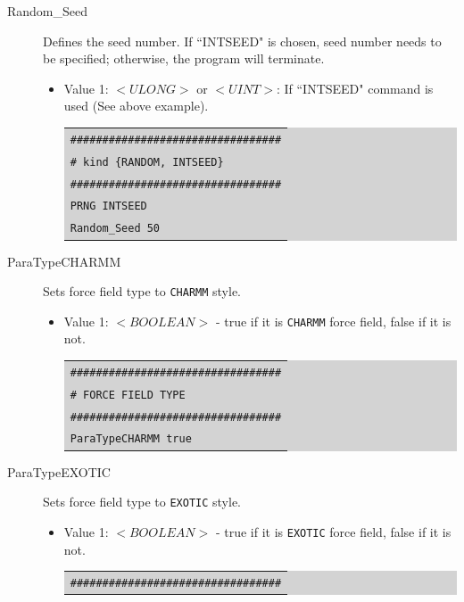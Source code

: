 \begin{description}
\begin{itemize}
\begin{itemize}
{\begin{tabular}{l}
		\end{tabular}}
		\end{itemize}
	\end{itemize}
\item [Random\_Seed] Defines the seed number. If ``INTSEED" is chosen, seed number needs to be specified; otherwise, the program will terminate.
	\begin{itemize}
	\item Value 1: $<ULONG>$ or $<UINT>$: If ``INTSEED" command is used (See above example).\\
	\colorbox{lightgray}{
	\begin{tabular}{l}
	\texttt{\#\#\#\#\#\#\#\#\#\#\#\#\#\#\#\#\#\#\#\#\#\#\#\#\#\#\#\#\#\#\#\#\#}\\
	\texttt{\# kind \{RANDOM, INTSEED\}}\\
	\texttt{\#\#\#\#\#\#\#\#\#\#\#\#\#\#\#\#\#\#\#\#\#\#\#\#\#\#\#\#\#\#\#\#\#}\\
	\texttt{PRNG INTSEED}\\
	\texttt{Random\_Seed 50}\\
	\end{tabular}}
	\end{itemize}
\item [ParaTypeCHARMM] Sets force field type to \texttt{CHARMM} style.
	\begin{itemize}
	\item Value 1: $<BOOLEAN>$ - true if it is \texttt{CHARMM} force field, false if it is not.\\
	\colorbox{lightgray}{
	\begin{tabular}{l}
	\texttt{\#\#\#\#\#\#\#\#\#\#\#\#\#\#\#\#\#\#\#\#\#\#\#\#\#\#\#\#\#\#\#\#\#}\\
	\texttt{\# FORCE FIELD TYPE}\\
	\texttt{\#\#\#\#\#\#\#\#\#\#\#\#\#\#\#\#\#\#\#\#\#\#\#\#\#\#\#\#\#\#\#\#\#}\\
	\texttt{ParaTypeCHARMM true}\\
	\end{tabular}}
	\end{itemize}
\item [ParaTypeEXOTIC] Sets force field type to \texttt{EXOTIC} style.
	\begin{itemize}	
	\item Value 1: $<BOOLEAN>$ - true if it is \texttt{EXOTIC} force field, false if it is not.\\
	\colorbox{lightgray}{
	\begin{tabular}{l}
	\texttt{\#\#\#\#\#\#\#\#\#\#\#\#\#\#\#\#\#\#\#\#\#\#\#\#\#\#\#\#\#\#\#\#\#}\\

\end{tabular}}
\end{itemize}
\end{description}
